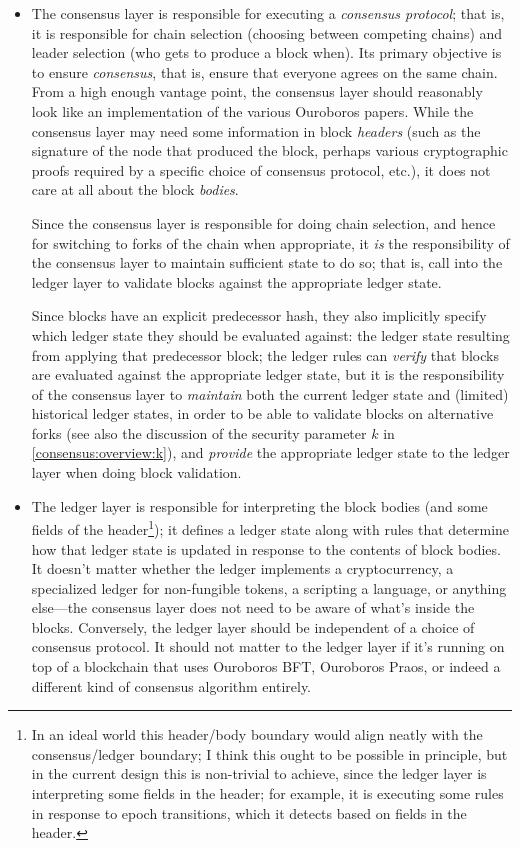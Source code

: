 \begin{itemize}
\item The consensus layer is responsible for executing a \emph{consensus
protocol}; that is, it is responsible for chain selection (choosing between
competing chains) and leader selection (who gets to produce a block when). Its
primary objective is to ensure \emph{consensus}, that is, ensure that everyone
agrees on the same chain. From a high enough vantage point, the consensus layer
should reasonably look like an implementation of the various Ouroboros papers.
While the consensus layer may need some information in block \emph{headers}
(such as the signature of the node that produced the block, perhaps various
cryptographic proofs required by a specific choice of consensus protocol, etc.),
it does not care at all about the block \emph{bodies}.

Since the consensus layer is responsible for doing chain selection, and hence
for switching to forks of the chain when appropriate, it \emph{is} the
responsibility of the consensus layer to maintain sufficient state to do so;
that is, call into the ledger layer to validate blocks against the appropriate
ledger state.

Since blocks have an explicit predecessor hash, they also implicitly specify
which ledger state they should be evaluated against: the ledger state resulting
from applying that predecessor block; the ledger rules can \emph{verify} that
blocks are evaluated against the appropriate ledger state, but it is the
responsibility of the consensus layer to \emph{maintain} both the current ledger
state and (limited) historical ledger states, in order to be able to validate
blocks on alternative forks (see also the discussion of the security parameter
$k$ in \cref{consensus:overview:k}), and \emph{provide} the appropriate ledger
state to the ledger layer when doing block validation.

\item The ledger layer is responsible for interpreting the block bodies (and
some fields of the header\footnote{In an ideal world this header/body boundary
would align neatly with the consensus/ledger boundary; I think this ought to be
possible in principle, but in the current design this is non-trivial to achieve,
since the ledger layer is interpreting some fields in the header; for example,
it is executing some rules in response to epoch transitions, which it detects
based on fields in the header.}); it defines a ledger state along with rules
that determine how that ledger state is updated in response to the contents of
block bodies. It doesn't matter whether the ledger implements a cryptocurrency,
a specialized ledger for non-fungible tokens, a scripting a language, or
anything else---the consensus layer does not need to be aware of what's inside
the blocks. Conversely, the ledger layer should be independent of a choice of
consensus protocol. It should not matter to the ledger layer if it's running on
top of a blockchain that uses Ouroboros BFT, Ouroboros Praos, or indeed a
different kind of consensus algorithm entirely.


\end{itemize}
